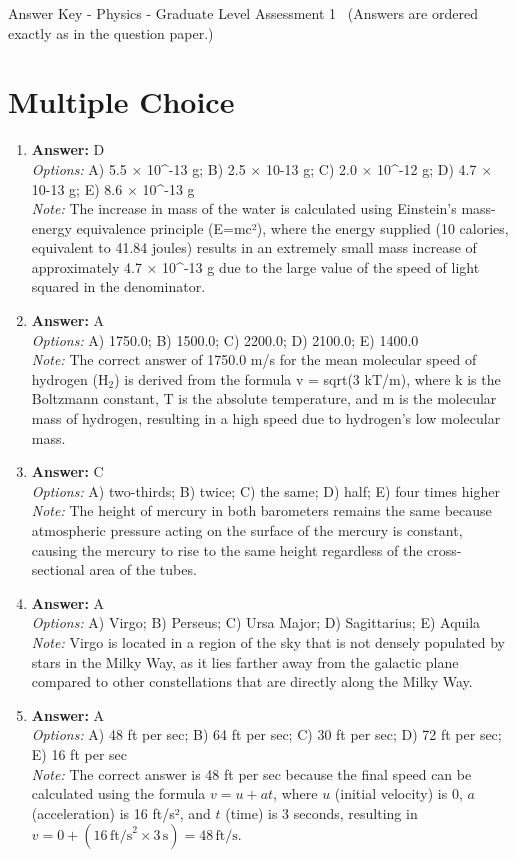 \documentclass[12pt]{article}
\begin{document}
\begin{center}
Answer Key - Physics - Graduate Level Assessment 1 \
\small (Answers are ordered exactly as in the question paper.)
\end{center}

\section*{Multiple Choice}
\begin{enumerate}[label=\arabic*.]
\item \textbf{Answer:} D
\\ \textit{Options:} A) 5.5 \ensuremath{\times} 10^-13 g; B) 2.5 \ensuremath{\times} 10-13 g; C) 2.0 \ensuremath{\times} 10^-12 g; D) 4.7 \ensuremath{\times} 10-13 g; E) 8.6 \ensuremath{\times} 10^-13 g
\\ \textit{Note:} The increase in mass of the water is calculated using Einstein's mass-energy equivalence principle (E=mc²), where the energy supplied (10 calories, equivalent to 41.84 joules) results in an extremely small mass increase of approximately 4.7 × 10^-13 g due to the large value of the speed of light squared in the denominator.
\item \textbf{Answer:} A
\\ \textit{Options:} A) 1750.0; B) 1500.0; C) 2200.0; D) 2100.0; E) 1400.0
\\ \textit{Note:} The correct answer of 1750.0 m/s for the mean molecular speed of hydrogen (H$_{2}$) is derived from the formula v = sqrt(3 kT/m), where k is the Boltzmann constant, T is the absolute temperature, and m is the molecular mass of hydrogen, resulting in a high speed due to hydrogen's low molecular mass.
\item \textbf{Answer:} C
\\ \textit{Options:} A) two-thirds; B) twice; C) the same; D) half; E) four times higher
\\ \textit{Note:} The height of mercury in both barometers remains the same because atmospheric pressure acting on the surface of the mercury is constant, causing the mercury to rise to the same height regardless of the cross-sectional area of the tubes.
\item \textbf{Answer:} A
\\ \textit{Options:} A) Virgo; B) Perseus; C) Ursa Major; D) Sagittarius; E) Aquila
\\ \textit{Note:} Virgo is located in a region of the sky that is not densely populated by stars in the Milky Way, as it lies farther away from the galactic plane compared to other constellations that are directly along the Milky Way.
\item \textbf{Answer:} A
\\ \textit{Options:} A) 48 ft per sec; B) 64 ft per sec; C) 30 ft per sec; D) 72 ft per sec; E) 16 ft per sec
\\ \textit{Note:} The correct answer is 48 ft per sec because the final speed can be calculated using the formula \( v = u + at \), where \( u \) (initial velocity) is 0, \( a \) (acceleration) is 16 ft/s², and \( t \) (time) is 3 seconds, resulting in \( v = 0 + (16 \, \text{ft/s}^2 \times 3 \, \text{s}) = 48 \, \text{ft/s} \).
\end{enumerate}
\end{document}
